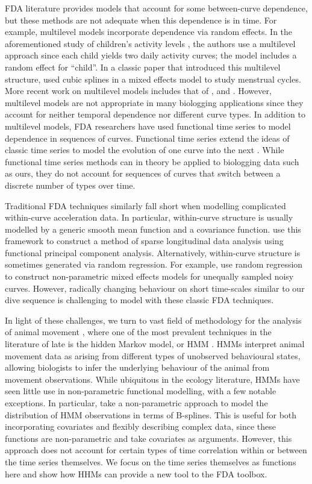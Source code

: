 FDA literature provides models that account for some between-curve dependence, but these methods are not adequate when this dependence is in time. For example, multilevel models incorporate dependence via random effects. In the aforementioned study of children's activity levels \citep{Morris:2007}, the authors use a multilevel approach since each child yields two daily activity curves; the model includes a random effect for ``child''. In a classic paper that introduced this multilevel structure,  \cite{Bromback:1998} used cubic splines in a mixed effects model to study menstrual cycles. More recent work on multilevel models includes that of \citet{Di:2009}, \citet{Chen:2012} and \citet{Crainiceanu:2009}. However, multilevel models are not appropriate in many biologging applications since they account for neither temporal dependence nor different curve types. 
In addition to multilevel models, FDA researchers have used functional time series to model dependence in sequences of curves. Functional time series extend the ideas of classic time series to model the evolution of one curve into the next \citep{Kokoszka:2018}. While functional time series methods can in theory be applied to biologging data such as ours, they do not account for sequences of curves that switch between a discrete number of types over time.
 
Traditional FDA techniques similarly fall short when modelling complicated within-curve acceleration data. In particular, within-curve structure is usually modelled by a generic smooth mean function and a covariance function. \citet{Yao:2005} use this framework to construct a method of sparse longitudinal data analysis using functional principal component analysis. Alternatively, within-curve structure is sometimes generated via random regression. For example, \citet{Rice:2001} use random regression to construct non-parametric mixed effects models for unequally sampled noisy curves. However, radically changing behaviour on short time-scales similar to our dive sequence is challenging to model with these classic FDA techniques.

In light of these challenges, we turn to vast field of methodology for the analysis of animal movement \citep{Hooten:2017}, where one of the most prevalent techniques in the literature of late is the hidden Markov model, or HMM \citep{Patterson:2017,McClintock:2020}. HMMs interpret animal movement data as arising from different types of unobserved behavioural states, allowing biologists to infer the underlying behaviour of the animal from movement observations. While ubiquitous in the ecology literature, HMMs have seen little use in non-parametric functional modelling, with a few notable exceptions. In particular, \citet{Langrock:2018} take a non-parametric approach to model the distribution of HMM observations in terms of B-splines. This is useful for both incorporating covariates and flexibly describing complex data, since these functions are non-parametric and take covariates as arguments. However, this approach does not account for certain types of time correlation within or between the time series themselves. We focus on the time series themselves as functions here and show how HHMs can provide a new tool to the FDA toolbox.

